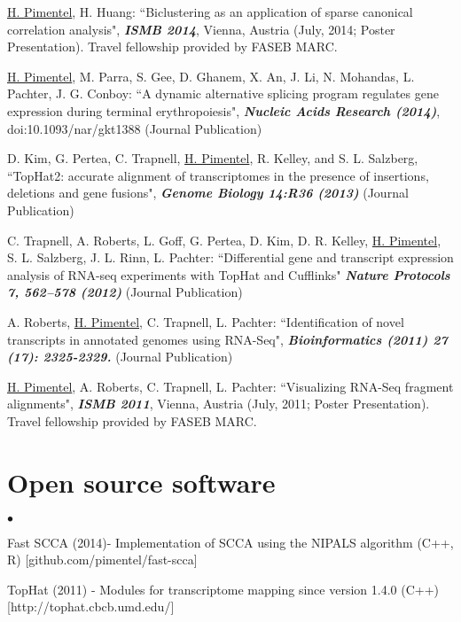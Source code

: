 \documentclass[margin,line]{res}
\newenvironment{list2}{
  \begin{list}{$\bullet$}{%
      \setlength{\itemsep}{0in}
      \setlength{\parsep}{0in} \setlength{\parskip}{0in}
      \setlength{\topsep}{0in} \setlength{\partopsep}{0in} 
      \setlength{\leftmargin}{0.2in}}}{\end{list}}
\begin{document}
\begin{resume}
\underline{H. Pimentel}, H. Huang: ``Biclustering as an application of sparse
canonical correlation analysis", {\bf \emph{ISMB 2014}}, Vienna, Austria (July,
2014; Poster Presentation). Travel fellowship provided by FASEB MARC. 

\underline{H. Pimentel}, M. Parra, S. Gee, D. Ghanem, X. An, J. Li, N.
Mohandas, L. Pachter, J. G. Conboy: ``A dynamic alternative splicing program
regulates gene expression during terminal erythropoiesis", {\bf \emph{Nucleic
    Acids Research (2014)}}, doi:10.1093/nar/gkt1388 (Journal Publication)

D. Kim, G. Pertea, C. Trapnell, \underline{H. Pimentel}, R. Kelley, and S.
L. Salzberg, ``TopHat2: accurate alignment of transcriptomes in the presence of
insertions, deletions and gene fusions", {\bf \emph{Genome Biology
    14:R36 (2013)}} (Journal Publication)

C. Trapnell, A. Roberts, L. Goff, G. Pertea, D. Kim, D. R. Kelley,
\underline{H. Pimentel}, S. L. Salzberg, J. L. Rinn, L. Pachter: ``Differential
gene and transcript expression analysis of RNA-seq experiments with TopHat and
Cufflinks" {\bf \emph{Nature Protocols 7, 562–578 (2012)}} (Journal Publication)

A. Roberts, \underline{H. Pimentel}, C. Trapnell, L. Pachter: ``Identification
of novel transcripts in annotated genomes using RNA-Seq", {\bf
  \emph{Bioinformatics (2011) 27 (17): 2325-2329.}} (Journal Publication)

\underline{H. Pimentel}, A. Roberts, C. Trapnell, L. Pachter: ``Visualizing
RNA-Seq fragment alignments", {\bf \emph{ISMB 2011}}, Vienna, Austria (July,
2011; Poster Presentation). Travel fellowship provided by FASEB MARC.

\section{\sc Open source software}
\begin{list2}
  \item Fast SCCA (2014)- Implementation of SCCA using the NIPALS algorithm (C++, R) [github.com/pimentel/fast-scca]
  \item TopHat (2011) - Modules for transcriptome mapping since version 1.4.0 (C++) [http://tophat.cbcb.umd.edu/]
\end{list2}


\end{resume}
\end{document}
